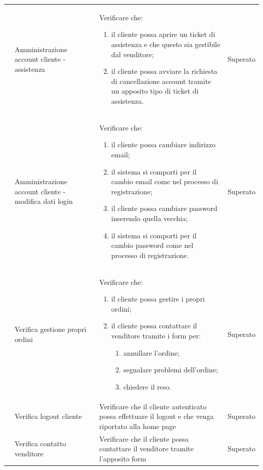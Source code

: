 \begin{center}
\begin{longtable}{|p{0.85cm}|p{2.25cm}|p{9cm}|p{3cm}|}
		 & Amministrazione account cliente - assistenza & Verificare che:
		\begin{enumerate}
			\item il cliente possa aprire un ticket di assistenza e che questo sia gestibile dal venditore;
			\item il cliente possa avviare la richiesta di cancellazione account tramite un apposito tipo di ticket di assistenza.
		\end{enumerate} & Superato\\

		 & Amministrazione account cliente - modifica dati login & Verificare che:
		\begin{enumerate}
			\item il cliente possa cambiare indirizzo email;
			\item il sistema si comporti per il cambio email come nel processo di registrazione;
			\item il cliente possa cambiare password inserendo quella vecchia;
			\item il sistema si comporti per il cambio password come nel processo di registrazione. 
		\end{enumerate} & Superato\\

		 & Verifica gestione propri ordini & Verificare che:
		\begin{enumerate}
			\item il cliente possa gestire i propri ordini;
			\item il cliente possa contattare il venditore tramite i form per:
			\begin{enumerate}
				\item annullare l'ordine;
				\item segnalare problemi dell'ordine;
				\item chiedere il reso.
			\end{enumerate}
		\end{enumerate} & Superato\\

		 & Verifica logout cliente & Verificare che il cliente autenticato possa effettuare il logout e che venga riportato alla home page & Superato\\

		 & Verifica contatto venditore & Verificare che il cliente possa contattare il venditore tramite l'apposito form  & Superato\\


\end{longtable}
\end{center}

